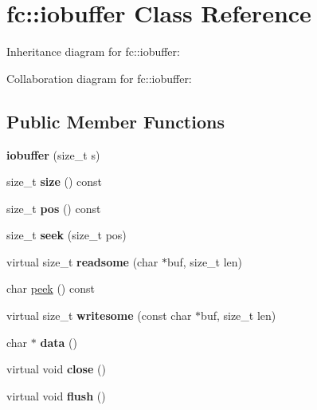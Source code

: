 \hypertarget{classfc_1_1iobuffer}{}\section{fc\+:\+:iobuffer Class Reference}
\label{classfc_1_1iobuffer}


Inheritance diagram for fc\+:\+:iobuffer\+:


Collaboration diagram for fc\+:\+:iobuffer\+:
\subsection*{Public Member Functions}
\begin{DoxyCompactItemize}
\item 
\mbox{\label{classfc_1_1iobuffer_aa3f2dcd33ae96f405bc5a6db337efa15}} 
{\bfseries iobuffer} (size\+\_\+t s)
\item 
\mbox{\label{classfc_1_1iobuffer_a29c646846e914c20ff0bde867a2f0f78}} 
size\+\_\+t {\bfseries size} () const
\item 
\mbox{\label{classfc_1_1iobuffer_afa4d1ec3b4d64b001df17892552401b5}} 
size\+\_\+t {\bfseries pos} () const
\item 
\mbox{\label{classfc_1_1iobuffer_a67df9fe367da2100489c5b6fb1edc590}} 
size\+\_\+t {\bfseries seek} (size\+\_\+t pos)
\item 
\mbox{\label{classfc_1_1iobuffer_a3fed1791ec6e6d8d129426549569fd33}} 
virtual size\+\_\+t {\bfseries readsome} (char $\ast$buf, size\+\_\+t len)
\item 
char \mbox{\hyperlink{classfc_1_1iobuffer_a0fba1dc12428ca55e7ed8810534b1fc3}{peek}} () const
\item 
\mbox{\label{classfc_1_1iobuffer_a0960b07106d328865bff43abd3982961}} 
virtual size\+\_\+t {\bfseries writesome} (const char $\ast$buf, size\+\_\+t len)
\item 
\mbox{\label{classfc_1_1iobuffer_a5de99170332e871983e6ead0ba69a2ba}} 
char $\ast$ {\bfseries data} ()
\item 
\mbox{\label{classfc_1_1iobuffer_aa1c346803447c6f86bf1e6eb01e63f51}} 
virtual void {\bfseries close} ()
\item 
\mbox{\label{classfc_1_1iobuffer_a75c44be3a5ce018f6e7d714da34917fd}} 
virtual void {\bfseries flush} ()
\end{DoxyCompactItemize}


